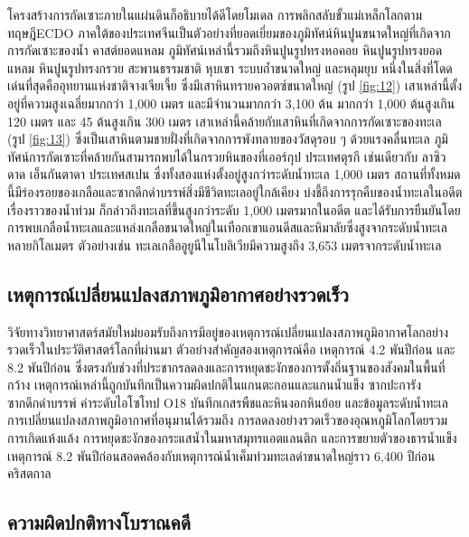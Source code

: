 \documentclass[10pt,twocolumn,letterpaper]{article}
\begin{document}
โครงสร้างการกัดเซาะภายในแผ่นดินก็อธิบายได้ดีโดยโมเดล การพลิกสลับขั้วแม่เหล็กโลกตามทฤษฎีECDO
 ภาคใต้ของประเทศจีนเป็นตัวอย่างที่ยอดเยี่ยมของภูมิทัศน์หินปูนขนาดใหญ่ที่เกิดจากการกัดเซาะของน้ำ \cite{82}  คาสต์ยอดแหลม ภูมิทัศน์เหล่านี้รวมถึงหินปูนรูปทรงหอคอย หินปูนรูปทรงยอดแหลม หินปูนรูปทรงกรวย สะพานธรรมชาติ หุบเขา ระบบถ้ำขนาดใหญ่ และหลุมยุบ หนึ่งในสิ่งที่โดดเด่นที่สุดคืออุทยานแห่งชาติจางเจียเจี้ย ซึ่งมีเสาหินทรายควอตซ์ขนาดใหญ่ (รูป \ref{fig:12}) \cite{84} เสาเหล่านี้ตั้งอยู่ที่ความสูงเฉลี่ยมากกว่า 1,000 เมตร และมีจำนวนมากกว่า 3,100 ต้น มากกว่า 1,000 ต้นสูงเกิน 120 เมตร และ 45 ต้นสูงเกิน 300 เมตร \cite{85} เสาเหล่านี้คล้ายกับเสาหินที่เกิดจากการกัดเซาะของทะเล  (รูป \ref{fig:13}) ซึ่งเป็นเสาหินตามชายฝั่งที่เกิดจากการพังทลายของวัสดุรอบ ๆ ด้วยแรงคลื่นทะเล ภูมิทัศน์การกัดเซาะที่คล้ายกันสามารถพบได้ในกรวยหินของที่เออร์กุป ประเทศตุรกี เช่นเดียวกับ ลาซิวดาด เอ็นกันตาดา ประเทศสเปน ซึ่งทั้งสองแห่งตั้งอยู่สูงกว่าระดับน้ำทะเล 1,000 เมตร สถานที่ทั้งหมดนี้มีร่องรอยของเกลือและซากดึกดำบรรพ์สิ่งมีชีวิตทะเลอยู่ใกล้เคียง บ่งชี้ถึงการรุกคืบของน้ำทะเลในอดีต \cite{15,86,87} เรื่องราวของน้ำท่วม \cite{3} ก็กล่าวถึงทะเลที่ขึ้นสูงกว่าระดับ 1,000 เมตรมากในอดีต และได้รับการยืนยันโดยการพบเกลือน้ำทะเลและแหล่งเกลือขนาดใหญ่ในเทือกเขาแอนดีสและหิมาลัยซึ่งสูงจากระดับน้ำทะเลหลายกิโลเมตร ตัวอย่างเช่น ทะเลเกลืออูยูนีในโบลิเวียมีความสูงถึง 3,653 เมตรจากระดับน้ำทะเล \cite{94}

\subsection{เหตุการณ์เปลี่ยนแปลงสภาพภูมิอากาศอย่างรวดเร็ว}

วิจัยทางวิทยาศาสตร์สมัยใหม่ยอมรับถึงการมีอยู่ของเหตุการณ์เปลี่ยนแปลงสภาพภูมิอากาศโลกอย่างรวดเร็วในประวัติศาสตร์โลกที่ผ่านมา ตัวอย่างสำคัญสองเหตุการณ์คือ เหตุการณ์ 4.2 พันปีก่อน และ 8.2 พันปีก่อน ซึ่งตรงกับช่วงที่ประชากรลดลงและการหยุดชะงักของการตั้งถิ่นฐานของสังคมในพื้นที่กว้าง เหตุการณ์เหล่านี้ถูกบันทึกเป็นความผิดปกติในแกนตะกอนและแกนน้ำแข็ง ซากปะการังซากดึกดำบรรพ์ ค่าระดับไอโซโทป O18 บันทึกเกสรพืชและหินงอกหินย้อย และข้อมูลระดับน้ำทะเล การเปลี่ยนแปลงสภาพภูมิอากาศที่อนุมานได้รวมถึง การลดลงอย่างรวดเร็วของอุณหภูมิโลกโดยรวม การเกิดแห้งแล้ง การหยุดชะงักของกระแสน้ำในมหาสมุทรแอตแลนติก และการขยายตัวของธารน้ำแข็ง \cite{90,91,92} เหตุการณ์ 8.2 พันปีก่อนสอดคล้องกับเหตุการณ์น้ำเค็มท่วมทะเลดำขนาดใหญ่ราว 6,400 ปีก่อนคริสตกาล \cite{93}

\subsection{ความผิดปกติทางโบราณคดี}
\end{document}
